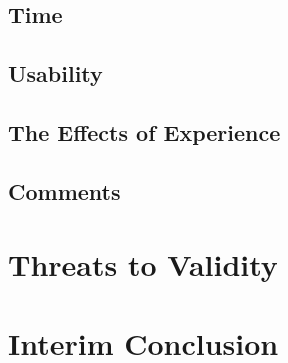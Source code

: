 \documentclass[../thesis]{subfiles}
\begin{document}
\subsection{Time}\label{subsec:time}
\fxfatal{}

\subsection{Usability}
\fxfatal{}


\subsection{The Effects of Experience}\label{subsec:experience}
\fxfatal{}

\subsection{Comments}
\fxfatal{}

\section{Threats to Validity}\label{sec:threats}
\fxfatal{}

\section{Interim Conclusion}  %
\fxfatal{}
\end{document}
